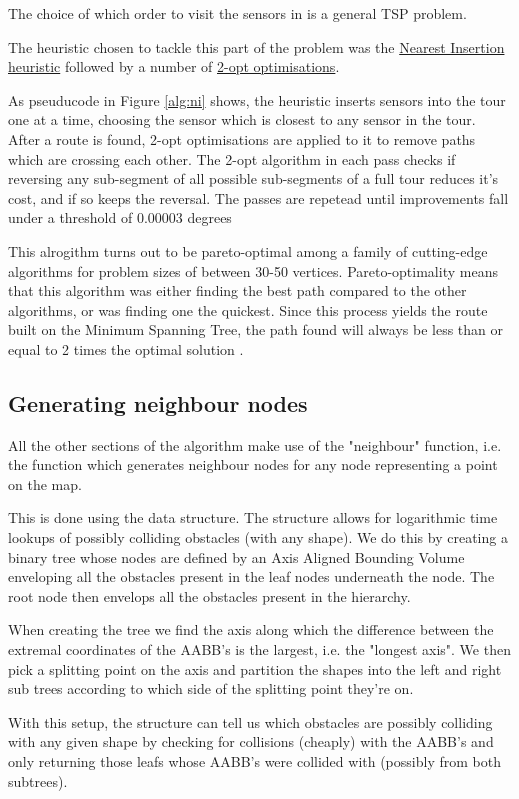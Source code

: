 \documentclass[10pt,a4paper]{article}
\begin{document}
The choice of which order to visit the sensors in is a general TSP problem.
\par 
The heuristic chosen to tackle this part of the problem was the \hyperref[tab:NearestInsertionCollectionOrderPlanner]{\color{blue}Nearest Insertion heuristic} followed by a number of \hyperref[tab:Optimiser2Opt]{\color{blue}2-opt optimisations}.
\par
As pseuducode in Figure \ref{alg:ni} shows, the heuristic inserts sensors into the tour one at a time, choosing the sensor which is closest to any sensor in the tour.
\\
After a route is found, 2-opt optimisations are applied to it to remove paths which are crossing each other.
The 2-opt algorithm in each pass checks if reversing any sub-segment of all possible sub-segments of a full tour reduces it's cost, and if so keeps the reversal. 
The passes are repetead until improvements fall under a threshold of 0.00003 degrees

This alrogithm turns out to be pareto-optimal \cite{metric-tsp} among a family of cutting-edge algorithms for problem sizes of between 30-50 vertices.
Pareto-optimality means that this algorithm was either finding the best path compared to the other algorithms, or was finding one the quickest. 
Since this process yields the route built on the Minimum Spanning Tree, 
the path found will always be less than or equal to 2 times the optimal solution \cite{2-approximation-ni}.
\subsection{Generating neighbour nodes}
All the other sections of the algorithm make use of the "neighbour" function, i.e. the function which generates neighbour nodes for any node representing 
a point on the map.

This is done using the \hyperref[tab:BVHNode]{\color{blue}{Bounding Volume Hierarchy}} data structure. 
The structure allows for logarithmic time lookups of possibly colliding obstacles (with any shape).
We do this by creating a binary tree whose nodes are defined by an Axis Aligned Bounding Volume enveloping all the obstacles present in the leaf nodes underneath the node.
The root node then envelops all the obstacles present in the hierarchy.
\par
When creating the tree we find the axis along which the difference between the extremal coordinates of the AABB's is the largest, i.e. the "longest axis".
We then pick a splitting point on the axis and partition the shapes into the left and right sub trees according to which side of the splitting point they're on.
\par 
With this setup, the structure can tell us which obstacles are possibly colliding with any given shape by checking for collisions (cheaply) with the AABB's and only returning those leafs whose AABB's were collided with (possibly from both subtrees).
\end{document}
